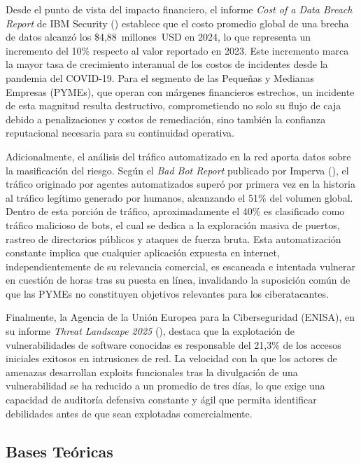 \documentclass[12pt, a4paper]{article}
\begin{document}
Desde el punto de vista del impacto financiero, el informe \textit{Cost of a Data
Breach Report} de IBM Security (\cite{ibm2024}) establece que el costo promedio
global de una brecha de datos alcanzó los \$4,88~millones~USD en
2024, lo que representa un incremento del 10\% respecto al valor reportado en
2023. Este incremento marca la mayor tasa de crecimiento interanual de los
costos de incidentes desde la pandemia del COVID-19. Para el segmento de las
Pequeñas y Medianas Empresas (PYMEs), que operan con márgenes financieros
estrechos, un incidente de esta magnitud resulta destructivo, comprometiendo no
solo su flujo de caja debido a penalizaciones y costos de remediación, sino
también la confianza reputacional necesaria para su continuidad operativa.

Adicionalmente, el análisis del tráfico automatizado en la red aporta datos sobre
la masificación del riesgo. Según el \textit{Bad Bot Report} publicado por
Imperva (\cite{imperva2025}), el tráfico originado por agentes automatizados
superó por primera vez en la historia al tráfico legítimo generado por humanos,
alcanzando el 51\% del volumen global. Dentro de esta porción de tráfico,
aproximadamente el 40\% es clasificado como tráfico malicioso de bots, el cual se
dedica a la exploración masiva de puertos, rastreo de directorios públicos
y ataques de fuerza bruta. Esta automatización constante implica que cualquier
aplicación expuesta en internet, independientemente de su relevancia comercial,
es escaneada e intentada vulnerar en cuestión de horas tras su puesta en línea,
invalidando la suposición común de que las PYMEs no constituyen objetivos
relevantes para los ciberatacantes.

Finalmente, la Agencia de la Unión Europea para la Ciberseguridad (ENISA), en su
informe \textit{Threat Landscape 2025} (\cite{enisa2025}), destaca que la
explotación de vulnerabilidades de software conocidas es responsable del 21,3\%
de los accesos iniciales exitosos en intrusiones de red. La velocidad con la
que los actores de amenazas desarrollan exploits funcionales tras la divulgación de
una vulnerabilidad se ha reducido a un promedio de tres días, lo que exige una
capacidad de auditoría defensiva constante y ágil que permita identificar
debilidades antes de que sean explotadas comercialmente.

\subsection{Bases Teóricas}
\end{document}
